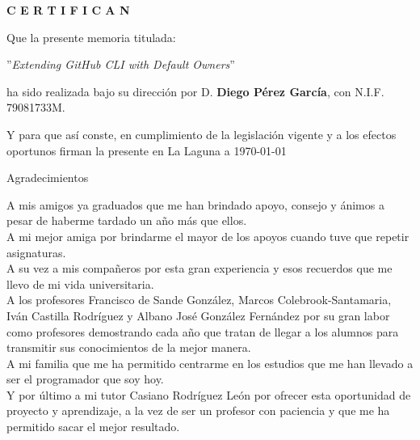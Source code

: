 \documentclass[spanish,a4paper,12pt,oneside]{extreport}
\begin{document}
\bigskip
\bigskip
{\bf C E R T I F I C A N}

\bigskip
\bigskip
Que la presente memoria titulada:

\bigskip
''{\it Extending GitHub CLI with Default Owners}''

\bigskip
\bigskip
\bigskip

\noindent ha sido realizada bajo su dirección por D. {\bf Diego Pérez García},
con N.I.F. 79081733M.

\bigskip
\bigskip

Y para que así conste, en cumplimiento de la legislación vigente y a los efectos
oportunos firman la presente en La Laguna a \today

\newpage
\thispagestyle{empty}


\begin{LARGE}
Agradecimientos
\end{LARGE}

\hspace{3mm}

\begin{large}
A mis amigos ya graduados que me han brindado apoyo, consejo y ánimos a pesar de haberme tardado un año más que ellos. \\
A mi mejor amiga por brindarme el mayor de los apoyos cuando tuve que repetir asignaturas. \\
A su vez a mis compañeros por esta gran experiencia y esos recuerdos que me llevo de mi vida universitaria. \\
A los profesores Francisco de Sande González, Marcos Colebrook-Santamaria, Iván Castilla Rodríguez y Albano José González Fernández por su gran labor como profesores demostrando cada año que tratan de llegar a los alumnos para transmitir sus conocimientos de la mejor manera. \\
A mi familia que me ha permitido centrarme en los estudios que me han llevado a ser el programador que soy hoy. \\
Y por último a mi tutor Casiano Rodríguez León por ofrecer esta oportunidad de proyecto y aprendizaje, a la vez de ser un profesor con paciencia y que me ha permitido sacar el mejor resultado. \\
\end{large}

\newpage
\thispagestyle{empty}
\end{document}
